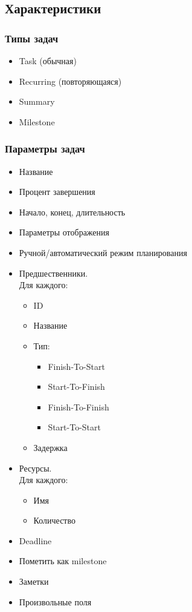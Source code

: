 \documentclass[a4paper, 14pt]{extarticle}
\begin{document}
\subsection{Характеристики}
\subsubsection{Типы задач}
\begin{itemize}
    \item Task (обычная)
    \item Recurring (повторяющаяся)
    \item Summary
    \item Milestone
\end{itemize}

\subsubsection{Параметры задач}
\begin{itemize}
    \item Название
    \item Процент завершения
    \item Начало, конец, длительность
    \item Параметры отображения
    \item Ручной/автоматический режим планирования
    \item Предшественники.\\
    Для каждого:
    \begin{itemize}
        \item ID
        \item Название
        \item Тип:
        \begin{itemize}
            \item Finish-To-Start
            \item Start-To-Finish
            \item Finish-To-Finish
            \item Start-To-Start
        \end{itemize}
        \item Задержка
    \end{itemize}
    \item Ресурсы.\\
    Для каждого:
    \begin{itemize}
        \item Имя
        \item Количество
    \end{itemize}
    \item Deadline
    \item Пометить как milestone
    \item Заметки
    \item Произвольные поля
\end{itemize}
\end{document}
